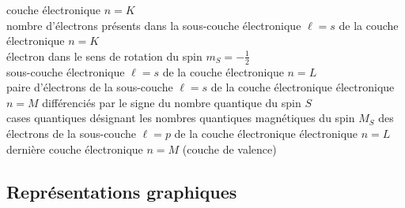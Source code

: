 \begin{minipage}{\linewidth} %
	\begin{multicols}{2} %
		couche électronique $n=K$\\ %
		nombre d'électrons présents dans la sous-couche électronique $\ell=s$ de la couche électronique $n=K$\\
		électron dans le sens de rotation du spin $m_{S}=-\frac{1}{2}$\\
		sous-couche électronique $\ell=s$ de la couche électronique $n=L$\\
		paire d'électrons de la sous-couche $\ell=s$ de la couche électronique électronique $n=M$ différenciés par le signe du nombre quantique du spin $S$
		\columnbreak\\ %
		cases quantiques désignant les nombres quantiques magnétiques du spin $M_S$ des électrons de la sous-couche $\ell=p$ de la couche électronique électronique $n=L$\\
		dernière couche électronique $n=M$ (couche de valence)
	\end{multicols}
\end{minipage}

\subsection{Représentations graphiques}

